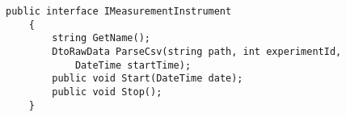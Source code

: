 \begin{lstlisting}[caption=The interface used to implement the measurement instruments, label={lst:measurement_instruments}]
    public interface IMeasurementInstrument
    {
        string GetName();
        DtoRawData ParseCsv(string path, int experimentId, 
            DateTime startTime);
        public void Start(DateTime date);
        public void Stop();
    }
\end{lstlisting}